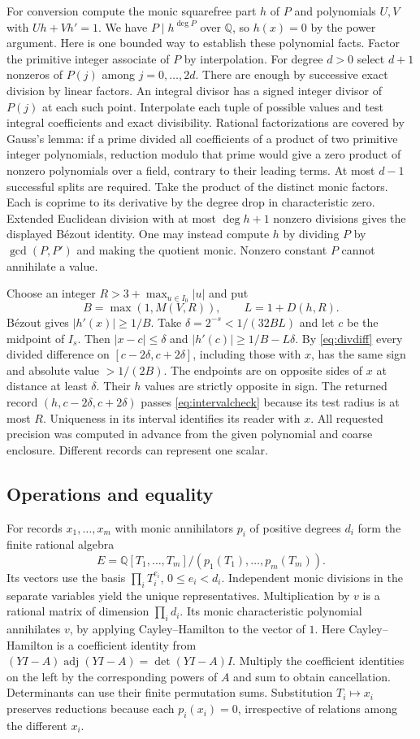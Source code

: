 For conversion compute the monic squarefree part $h$ of $P$ and
polynomials $U,V$ with $Uh+Vh'=1$. We have $P\mid h^{\deg P}$ over
$\mathbb Q$, so $h(x)=0$ by the power argument. Here is one bounded
way to establish these polynomial facts. Factor the primitive integer
associate of $P$ by interpolation. For degree $d>0$ select $d+1$
nonzeros of $P(j)$ among $j=0,\ldots,2d$. There are enough by
successive exact division by linear factors. An integral divisor
has a signed integer divisor of $P(j)$ at each such point. Interpolate
each tuple of possible values and test integral coefficients and exact
divisibility. Rational factorizations are covered by Gauss's lemma:
if a prime divided all coefficients of a product of two primitive
integer polynomials, reduction modulo that prime would give a zero
product of nonzero polynomials over a field, contrary to their leading
terms. At most $d-1$ successful splits are required. Take the product
of the distinct monic factors. Each is coprime to its derivative by
the degree drop in characteristic zero. Extended Euclidean division
with at most $\deg h+1$ nonzero divisions gives the displayed
B\'ezout identity. One may instead compute $h$ by dividing $P$ by
$\gcd(P,P')$ and making the quotient monic. Nonzero constant $P$
cannot annihilate a value.

Choose an integer $R>3+\max_{u\in I_0}|u|$ and put
\[
 B=\max(1,M(V,R)),\qquad L=1+D(h,R).
\]
B\'ezout gives $|h'(x)|\ge1/B$. Take $\delta=2^{-s}<1/(32BL)$
and let $c$ be the midpoint of $I_s$. Then $|x-c|\le\delta$ and
$|h'(c)|\ge1/B-L\delta$. By \eqref{eq:divdiff} every divided
difference on $[c-2\delta,c+2\delta]$, including those with $x$,
has the same sign and absolute value $>1/(2B)$. The endpoints are on
opposite sides of $x$ at distance at least $\delta$. Their $h$ values
are strictly opposite in sign. The returned record
$(h,c-2\delta,c+2\delta)$ passes \eqref{eq:intervalcheck} because its
test radius is at most $R$. Uniqueness in its interval identifies its
reader with $x$. All requested precision was computed in advance from
the given polynomial and coarse enclosure. Different records can
represent one scalar.

\subsection{Operations and equality}
For records $x_1,\ldots,x_m$ with monic annihilators $p_i$ of positive
degrees $d_i$ form the finite rational algebra
\[
 E=\mathbb Q[T_1,\ldots,T_m]/(p_1(T_1),\ldots,p_m(T_m)).
\]
Its vectors use the basis $\prod_iT_i^{e_i}$, $0\le e_i<d_i$.
Independent monic divisions in the separate variables yield the unique
representatives. Multiplication by $v$ is a rational matrix of dimension
$\prod_i d_i$. Its monic characteristic polynomial annihilates $v$,
by applying Cayley--Hamilton to the vector of $1$. Here Cayley--Hamilton
is a coefficient identity from
$(YI-A)\operatorname{adj}(YI-A)=\det(YI-A)I$. Multiply the coefficient
identities on the left by the corresponding powers of $A$ and sum to
obtain cancellation. Determinants can use their finite permutation
sums. Substitution $T_i\mapsto x_i$ preserves reductions because each
$p_i(x_i)=0$, irrespective of relations among the different $x_i$.

